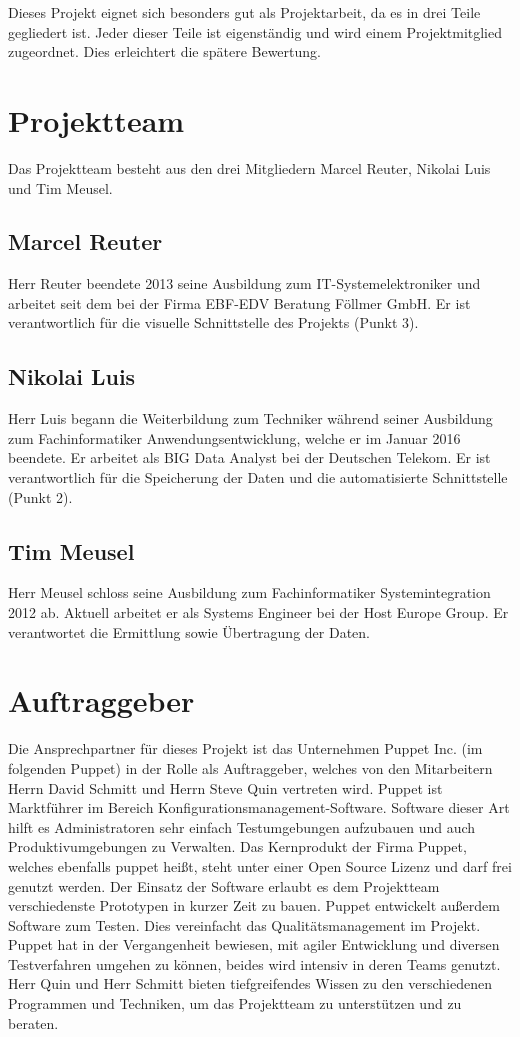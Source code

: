 Dieses Projekt eignet sich besonders gut als Projektarbeit, da es in drei Teile
gegliedert ist. Jeder dieser Teile ist eigenständig und wird einem
Projektmitglied zugeordnet. Dies erleichtert die spätere Bewertung.
\all%

\section{Projektteam}
Das Projektteam besteht aus den drei Mitgliedern Marcel Reuter, Nikolai Luis
und Tim Meusel.
\all%

\subsection{Marcel Reuter}
Herr Reuter beendete 2013 seine Ausbildung zum IT-Systemelektroniker und
arbeitet seit dem bei der Firma EBF-EDV Beratung Föllmer GmbH. Er ist
verantwortlich für die visuelle Schnittstelle des Projekts (Punkt 3).
\mr%

\subsection{Nikolai Luis}
Herr Luis begann die Weiterbildung zum Techniker während seiner Ausbildung zum
Fachinformatiker Anwendungsentwicklung, welche er im Januar 2016 beendete. Er
arbeitet als BIG Data Analyst bei der Deutschen Telekom. Er ist verantwortlich
für die Speicherung der Daten und die automatisierte Schnittstelle (Punkt 2).
\nl%

\subsection{Tim Meusel}
Herr Meusel schloss seine Ausbildung zum Fachinformatiker Systemintegration
2012 ab. Aktuell arbeitet er als Systems Engineer bei der Host Europe Group.
Er verantwortet die Ermittlung sowie Übertragung der Daten.
\tm%

\section{Auftraggeber}
Die Ansprechpartner für dieses Projekt ist das Unternehmen Puppet Inc. (im
folgenden Puppet) in der Rolle als Auftraggeber, welches von den Mitarbeitern
Herrn David Schmitt und Herrn Steve Quin vertreten wird. Puppet ist Marktführer
im Bereich Konfigurationsmanagement-Software. Software dieser Art hilft es
Administratoren sehr einfach Testumgebungen aufzubauen und auch
Produktivumgebungen zu Verwalten. Das Kernprodukt der Firma Puppet, welches
ebenfalls puppet heißt, steht unter einer Open Source Lizenz und darf frei
genutzt werden. Der Einsatz der Software erlaubt es dem Projektteam
verschiedenste Prototypen in kurzer Zeit zu bauen. Puppet entwickelt außerdem
Software zum Testen. Dies vereinfacht das Qualitätsmanagement im Projekt.
Puppet hat in der Vergangenheit bewiesen, mit agiler Entwicklung und diversen
Testverfahren umgehen zu können, beides wird intensiv in deren Teams genutzt.
Herr Quin und Herr Schmitt bieten tiefgreifendes Wissen zu den verschiedenen
Programmen und Techniken, um das Projektteam zu unterstützen und zu beraten.
\all%

